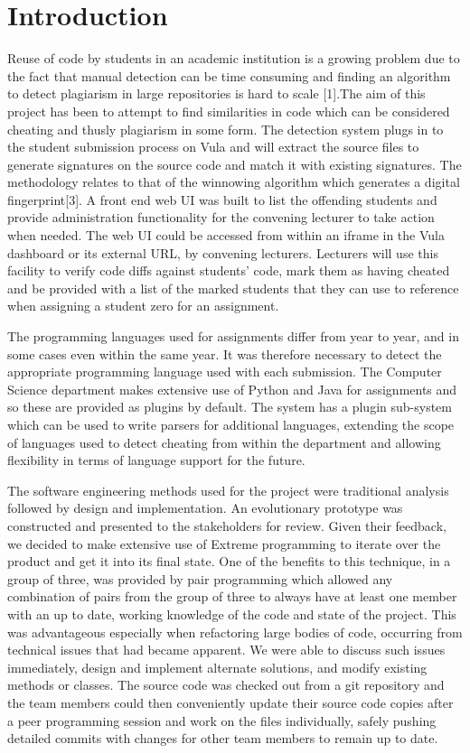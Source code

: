 \documentclass[11pt,a4paper]{article}
\begin{document}
\section{Introduction}
\label{s:introduction}

Reuse of code by students in an academic institution is a growing problem due to the fact  that manual detection can be time consuming and finding an algorithm to detect plagiarism in large repositories is hard to scale [1].The aim of this project has been to attempt to find similarities in code which can be considered cheating and thusly plagiarism in some form. The detection system plugs in to the student submission process on Vula and will extract the source files to generate signatures on the source code and match it with existing signatures. The methodology relates to that of the winnowing algorithm which generates a digital fingerprint[3]. A front end web UI was built to list the offending students and provide administration functionality for the convening lecturer to take action when needed. The web UI could be accessed from within an iframe in the Vula dashboard or its external URL, by convening lecturers. Lecturers will use this facility to verify code diffs against students' code, mark them as having cheated and be provided with a list of the marked students that they can use to reference when assigning a student zero for an assignment.

The programming languages used for assignments differ from year to year, and in some cases even within the same year. It was therefore necessary to detect the appropriate programming language used with each submission. The Computer Science department makes extensive use of Python and Java for assignments and so these are provided as plugins by default. The system has a plugin sub-system which can be used to write parsers for additional languages, extending the scope of languages used to detect cheating from within the department and allowing flexibility in terms of language support for the future.

The software engineering methods used for the project were traditional analysis followed by design and implementation. An evolutionary prototype was constructed and presented to the stakeholders for review. Given their feedback, we decided to make extensive use of Extreme programming to iterate over the product and get it into its final state. One of the benefits to this technique, in a group of three, was provided by pair programming which allowed any combination of pairs from the group of three to always have at least one member with an up to date, working knowledge of the code and state of the project. This was advantageous especially when refactoring large bodies of code, occurring from technical issues that had became apparent. We were able to discuss such issues immediately, design and implement alternate solutions, and modify existing methods or classes. The source code was checked out from a git repository and the team members could then conveniently update their source code copies after a peer programming session and work on the files individually, safely pushing detailed commits with changes for other team members to remain up to date.
\end{document}
